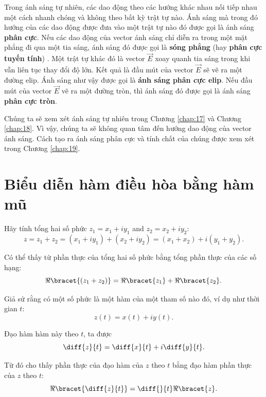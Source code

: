 Trong ánh sáng tự nhiên, các dao động theo các hướng khác nhau nối tiếp nhau một cách nhanh chóng và không theo bất kỳ trật tự nào.
Ánh sáng mà trong đó hướng của các dao động được đưa vào một trật tự nào đó được gọi là ánh sáng \textbf{phân cực}.
Nếu các dao động của vector ánh sáng chỉ diễn ra trong một mặt phẳng đi qua một tia sáng, ánh sáng đó được gọi là \textbf{sóng phẳng} (hay \textbf{phân cực} \textbf{tuyến tính}) .
Một trật tự khác đó là vector $\vec{E}$ xoay quanh tia sáng trong khi vẫn liên tục thay đổi độ lớn. Kết quả là đầu mút của vector $\vec{E}$ sẽ vẽ ra một đường elip.
Ánh sáng như vậy được gọi là \textbf{ánh sáng phân cực elip}.
Nếu đầu mút của vector $\vec{E}$ vẽ ra một đường tròn, thì ánh sáng đó được gọi là ánh sáng \textbf{phân cực tròn}.

Chúng ta sẽ xem xét ánh sáng tự nhiên trong Chương \ref{chap:17} và Chương \ref{chap:18}.
Vì vậy, chúng ta sẽ không quan tâm đến hướng dao động của vector ánh sáng.
Cách tạo ra ánh sáng phân cực và tính chất của chúng được xem xét trong Chương \ref{chap:19}.

\section{Biểu diễn hàm điều hòa bằng hàm mũ}\label{sec:16_2}

Hãy tính tổng hai số phức $z_1 = x_1 + i y_1$ and $z_2 = x_2 + i y_2$:
\begin{equation}\label{eq:16_11}
    z = z_1 + z_2 = (x_1 + i y_1) + (x_2 + i y_2) = (x_1 + x_2) + i (y_1 + y_2).
\end{equation}

\noindent
Có thể thấy từ  phần thực của tổng hai số phức bằng tổng phần thực của các số hạng:
\begin{equation}\label{eq:16_12}
    \Re\bracet{(z_1 + z_2)} = \Re\bracet{z_1} + \Re\bracet{z_2}.
\end{equation}

Giả sử rằng có một số phức là một hàm của một tham số nào đó, ví dụ như thời gian $t$:
\begin{equation*}
    z(t) = x(t) + i y(t).
\end{equation*}

\noindent
Đạo hàm hàm này theo $t$, ta được
\begin{equation*}
    \diff{z}{t} = \diff{x}{t} + i \diff{y}{t}.
\end{equation*}

\noindent
Từ đó cho thấy phần thực của đạo hàm của $z$ theo $t$ bằng đạo hàm phần thực của $z$ theo $t$:
\begin{equation}\label{eq:16_13}
    \Re\bracet{\diff{z}{t}} = \diff{}{t}\Re\bracet{z}.
\end{equation}

